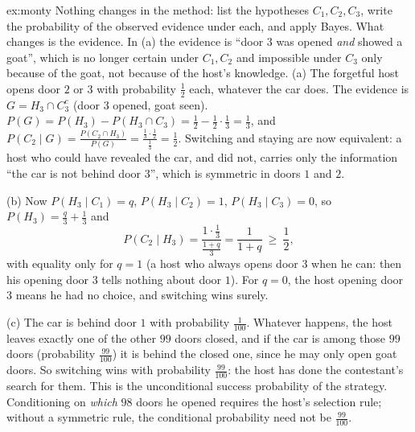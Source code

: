 \begin{solution}{ex:monty}
\idea Nothing changes in the method: list the hypotheses $C_1,C_2,C_3$, write the probability of the observed evidence under each, and apply Bayes. What changes is the evidence. In (a) the evidence is ``door $3$ was opened \emph{and} showed a goat'', which is no longer certain under $C_1,C_2$ and impossible under $C_3$ only because of the goat, not because of the host's knowledge.
\writeup (a) The forgetful host opens door $2$ or $3$ with probability $\frac12$ each, whatever the car does. The evidence is $G=H_3\cap C_3^c$ (door $3$ opened, goat seen). $P(G)=P(H_3)-P(H_3\cap C_3)=\frac12-\frac12\cdot\frac13=\frac13$, and $P(C_2\mid G)=\frac{P(C_2\cap H_3)}{P(G)}=\frac{\frac13\cdot\frac12}{\frac13}=\frac12$. Switching and staying are now equivalent: a host who could have revealed the car, and did not, carries only the information ``the car is not behind door $3$'', which is symmetric in doors $1$ and $2$.

(b) Now $P(H_3\mid C_1)=q$, $P(H_3\mid C_2)=1$, $P(H_3\mid C_3)=0$, so $P(H_3)=\frac q3+\frac13$ and
\[
P(C_2\mid H_3)=\frac{1\cdot\frac13}{\frac{1+q}3}=\frac1{1+q}\ \ge\ \frac12 ,
\]
with equality only for $q=1$ (a host who always opens door $3$ when he can: then his opening door $3$ tells nothing about door $1$). For $q=0$, the host opening door $3$ means he had no choice, and switching wins surely.

(c) The car is behind door $1$ with probability $\frac1{100}$. Whatever happens, the host leaves exactly one of the other $99$ doors closed, and if the car is among those $99$ doors (probability $\frac{99}{100}$) it is behind the closed one, since he may only open goat doors. So switching wins with probability $\frac{99}{100}$: the host has done the contestant's search for them. This is the unconditional success probability of the strategy. Conditioning on \emph{which} $98$ doors he opened requires the host's selection rule; without a symmetric rule, the conditional probability need not be $\frac{99}{100}$.
\end{solution}

